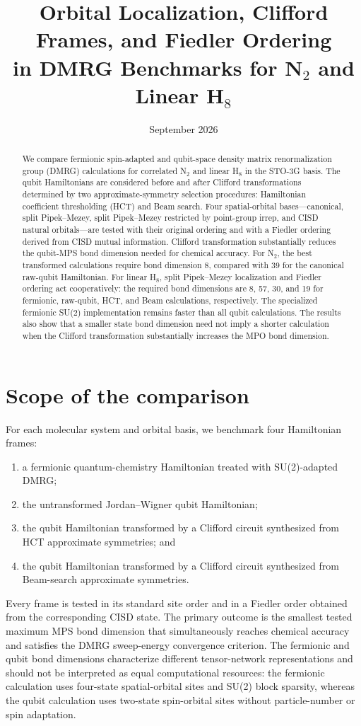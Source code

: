 \documentclass[a4paper,onecolumn,10pt]{article}
\title{Orbital Localization, Clifford Frames, and Fiedler Ordering\\
in DMRG Benchmarks for N$_2$ and Linear H$_8$}
\author{}
\date{September 2026}
\begin{document}
\maketitle

\begin{abstract}
We compare fermionic spin-adapted and qubit-space density matrix
renormalization group (DMRG) calculations for correlated N$_2$ and linear
H$_8$ in the STO-3G basis.  The qubit Hamiltonians are considered before and
after Clifford transformations determined by two approximate-symmetry
selection procedures: Hamiltonian coefficient thresholding (HCT) and Beam
search.  Four spatial-orbital bases---canonical, split Pipek--Mezey, split
Pipek--Mezey restricted by point-group irrep, and CISD natural
orbitals---are tested with their original ordering and with a Fiedler ordering
derived from CISD mutual information.  Clifford transformation substantially
reduces the qubit-MPS bond dimension needed for chemical accuracy.  For N$_2$,
the best transformed calculations require bond dimension 8, compared with 39
for the canonical raw-qubit Hamiltonian.  For linear H$_8$, split
Pipek--Mezey localization and Fiedler ordering act cooperatively: the required
bond dimensions are 8, 57, 30, and 19 for fermionic, raw-qubit, HCT, and Beam
calculations, respectively.  The specialized fermionic SU(2) implementation
remains faster than all qubit calculations.  The results also show that a
smaller state bond dimension need not imply a shorter calculation when the
Clifford transformation substantially increases the MPO bond dimension.
\end{abstract}

\section{Scope of the comparison}

For each molecular system and orbital basis, we benchmark four Hamiltonian
frames:
\begin{enumerate}
    \item a fermionic quantum-chemistry Hamiltonian treated with SU(2)-adapted
          DMRG;
    \item the untransformed Jordan--Wigner qubit Hamiltonian;
    \item the qubit Hamiltonian transformed by a Clifford circuit synthesized
          from HCT approximate symmetries; and
    \item the qubit Hamiltonian transformed by a Clifford circuit synthesized
          from Beam-search approximate symmetries.
\end{enumerate}
Every frame is tested in its standard site order and in a Fiedler order
obtained from the corresponding CISD state.  The primary outcome is the
smallest tested maximum MPS bond dimension that simultaneously reaches
chemical accuracy and satisfies the DMRG sweep-energy convergence criterion.
The fermionic and qubit bond dimensions characterize different tensor-network
representations and should not be interpreted as equal computational
resources: the fermionic calculation uses four-state spatial-orbital sites and
SU(2) block sparsity, whereas the qubit calculation uses two-state
spin-orbital sites without particle-number or spin adaptation.
\end{document}
